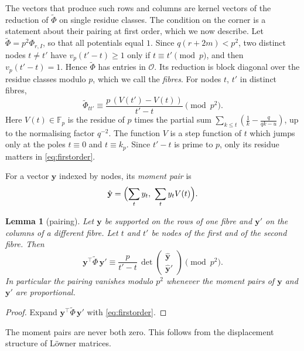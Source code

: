 \documentclass[11pt]{amsart}
\newtheorem{lemma}[theorem]{Lemma}
\theoremstyle{definition}
\theoremstyle{remark}
\numberwithin{equation}{section}
\newcommand{\F}{\mathbb F}
\newcommand{\cO}{\mathcal O}
\begin{document}
The vectors that produce such rows and columns are kernel vectors of the reduction of $\widetilde\Phi$ on single residue
classes. The condition on the corner is a statement about their pairing at first order, which we now describe. Let
$\widetilde\Phi=p^2\Phi_{r,I}$, so that all potentials equal $1$. Since $q(r+2m)<p^2$, two distinct nodes $t\ne t'$ have
$v_p(t'-t)\ge1$ only if $t\equiv t'\pmod p$, and then $v_p(t'-t)=1$. Hence $\widetilde\Phi$ has entries in $\cO$. Its
reduction is block diagonal over the residue classes modulo $p$, which we call the \emph{fibres}. For nodes $t$, $t'$
in distinct fibres,
\begin{equation}\label{eq:firstorder}
 \widetilde\Phi_{tt'}\equiv\frac{p\,(V(t')-V(t))}{t'-t}\pmod{p^2}.
\end{equation}
Here $V(t)\in\F_p$ is the residue of $p$ times the partial sum $\sum_{k\le t}(\frac1k-\frac q{qk-u})$, up to the
normalising factor $q^{-2}$. The function $V$ is a step function of $t$ which jumps only at the poles $t\equiv0$ and
$t\equiv k_p$. Since $t'-t$ is prime to $p$, only its residue matters in \eqref{eq:firstorder}.

For a vector $\mathbf y$ indexed by nodes, its \emph{moment pair} is
\[
 \hat{\mathbf y}=\Bigl(\sum_ty_t,\ \sum_ty_tV(t)\Bigr).
\]

\begin{lemma}[pairing]\label{lem:pairing}
Let $\mathbf y$ be supported on the rows of one fibre and $\mathbf y'$ on the columns of a different fibre. Let $t$ and
$t'$ be nodes of the first and of the second fibre. Then
\[
 \mathbf y^{\top}\widetilde\Phi\,\mathbf y'\equiv\frac p{t'-t}\,
 \det\begin{pmatrix}\hat{\mathbf y}\\ \hat{\mathbf y}'\end{pmatrix}\pmod{p^2}.
\]
In particular the pairing vanishes modulo $p^2$ whenever the moment pairs of $\mathbf y$ and $\mathbf y'$ are
proportional.
\end{lemma}
\begin{proof}
Expand $\mathbf y^{\top}\widetilde\Phi\,\mathbf y'$ with \eqref{eq:firstorder}.
\end{proof}

The moment pairs are never both zero. This follows from the displacement structure of L\"owner matrices.
\end{document}
